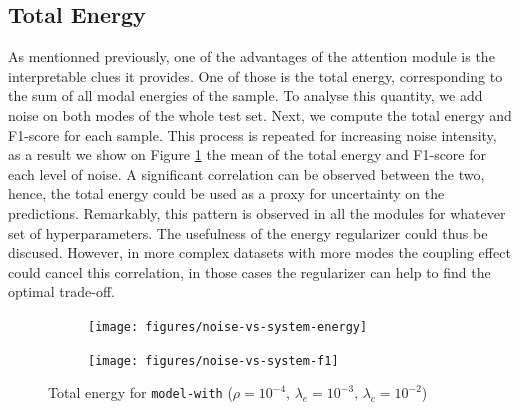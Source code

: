 \clearpage\subsection*{Total Energy}\label{sec:total-energy}
As mentionned previously, one of the advantages of the attention module is the interpretable clues it provides. One of those is the total energy, corresponding to the sum of all modal energies of the sample. To analyse this quantity, we add noise on both modes of the whole test set. Next, we compute the total energy and F1-score for each sample. This process is repeated for increasing noise intensity, as a result we show on Figure \ref{fig:exp-att-shift-5} the mean of the total energy and F1-score for each level of noise. A significant correlation can be observed between the two, hence, the total energy could be used as a proxy for uncertainty on the predictions. Remarkably, this pattern is observed in all the modules for whatever set of hyperparameters. The usefulness of the energy regularizer could thus be discused. However, in more complex datasets with more modes the coupling effect could cancel this correlation, in those cases the regularizer can help to find the optimal trade-off.
\begin{figure}[H]
\centering
\begin{subfigure}{.5\textwidth}
  \centering
  \texttt{[image: figures/noise-vs-system-energy]}
\end{subfigure}%
\begin{subfigure}{.5\textwidth}
  \centering
  \texttt{[image: figures/noise-vs-system-f1]}
\end{subfigure}
\caption{Total energy for \texttt{model-with} ($\rho=10^{-4},\,\lambda_e=10^{-3},\,\lambda_c=10^{-2}$)}
\label{fig:exp-att-shift-5}
\end{figure}

